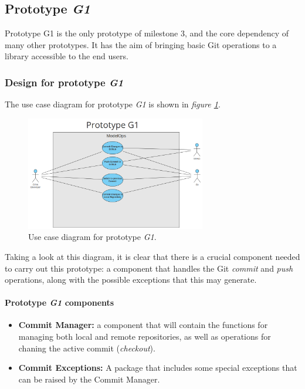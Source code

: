 \subsection{Prototype \emph{G1}}

Prototype G1 is the only prototype of milestone 3, and the core dependency of many other prototypes. It has the aim of bringing basic Git operations to a library accessible to the end users.

\subsubsection{Design for prototype \emph{G1}}

The use case diagram for prototype \emph{G1} is shown in \emph{figure \ref{fig:useCaseG1}}.

\begin{figure}[H]
    \centering
    \includegraphics[width=0.7\textwidth]{figs/use-case-G1.png}
    \caption{Use case diagram for prototype \emph{G1}.}
    \label{fig:useCaseG1}
\end{figure}

Taking a look at this diagram, it is clear that there is a crucial component needed to carry out this prototype: a component that handles the Git \emph{commit} and \emph{push} operations, along with
the possible exceptions that this may generate.

\paragraph{Prototype \emph{G1} components}

\begin{itemize}
    \item \textbf{Commit Manager: }a component that will contain the functions for managing both local and remote repositories, as well as operations for chaning the active commit (\emph{checkout}).
    
    \item \textbf{Commit Exceptions: }A package that includes some special exceptions that can be raised by the Commit Manager.
\end{itemize}


